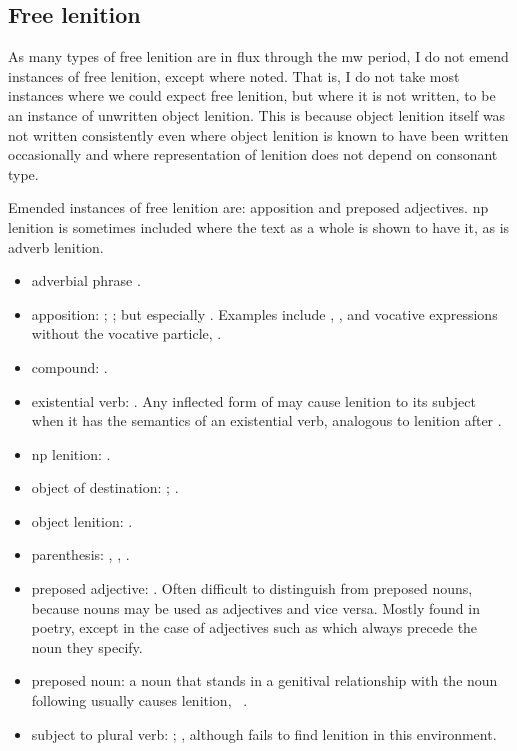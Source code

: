 \subsection{Free lenition}
\label{sec:free-lenition-1}
As many types of free lenition are in flux through the \gls{mw} period, I do not emend instances of free lenition, except where noted. That is, I do not take most instances where we could expect free lenition,  but where it is not written, to be an instance of unwritten object lenition. This is because object lenition itself was not written consistently even where object lenition is known to have been written occasionally and where representation of lenition does not depend on consonant type.

Emended instances of free lenition are: apposition and preposed adjectives. \gls{np} lenition is sometimes included where the text as a whole is shown to have it, as is adverb lenition.
\begin{itemize}
\item adverbial phrase \textcite[\S 19, 22]{evans_grammar_1964}.
\item apposition: \textcite[\S 19]{evans_grammar_1964}; \textcite[116--9, 122--3]{morgan_y_1952}; but especially \textcite{schrijver_free_2010}. Examples include , , and vocative expressions without the vocative particle, \eg {}.
\item compound: \textcite[\S 20, 22]{evans_grammar_1964}. 
\item existential verb:  \textcite[29--30]{van_development14}. Any inflected form of  may cause lenition to its subject when it has the semantics of an existential verb, analogous to lenition after .
\item \gls{np} lenition: \textcite[\S 21]{evans_grammar_1964}.
\item object of destination: \textcite[227]{morgan_y_1952}; \textcite[\S 21]{evans_grammar_1964}. 
\item object lenition: \textcite[\S 21]{evans_grammar_1964}.
\item parenthesis: \textcite[429]{morgan_y_1952}, \textcite[\S 21]{evans_grammar_1964}, \textcite[5--6]{schrijver_free_2010}.
\item preposed adjective: \textcite[35]{morgan_y_1952}. Often difficult to distinguish from preposed nouns, because nouns may be used as adjectives and vice versa. Mostly found in poetry, except in the case of adjectives such as  which always precede the noun  they specify.
\item preposed noun: a noun that stands in a genitival relationship with the noun following usually causes lenition, \eg {}~\autocite{daniel_cyfuniadau_2003}.
\item subject to plural verb: \textcite[\S 21]{evans_grammar_1964}; \textcite[2]{schrijver_free_2010}, although \textcite{van_development14} fails to find lenition in this environment.
\end{itemize}


